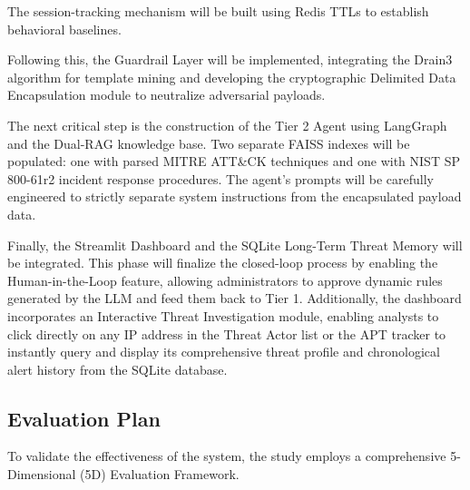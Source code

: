 \documentclass[12pt,a4paper]{article}
\begin{document}
The session-tracking mechanism will be built using Redis TTLs to establish behavioral baselines.

Following this, the Guardrail Layer will be implemented, integrating the Drain3 algorithm for template mining and developing the cryptographic Delimited Data Encapsulation module to neutralize adversarial payloads.

The next critical step is the construction of the Tier 2 Agent using LangGraph and the Dual-RAG knowledge base. Two separate FAISS indexes will be populated: one with parsed MITRE ATT\&CK techniques and one with NIST SP 800-61r2 incident response procedures. The agent's prompts will be carefully engineered to strictly separate system instructions from the encapsulated payload data.

Finally, the Streamlit Dashboard and the SQLite Long-Term Threat Memory will be integrated. This phase will finalize the closed-loop process by enabling the Human-in-the-Loop feature, allowing administrators to approve dynamic rules generated by the LLM and feed them back to Tier 1. Additionally, the dashboard incorporates an Interactive Threat Investigation module, enabling analysts to click directly on any IP address in the Threat Actor list or the APT tracker to instantly query and display its comprehensive threat profile and chronological alert history from the SQLite database.

\subsection{Evaluation Plan}
To validate the effectiveness of the system, the study employs a comprehensive 5-Dimensional (5D) Evaluation Framework.
\end{document}
